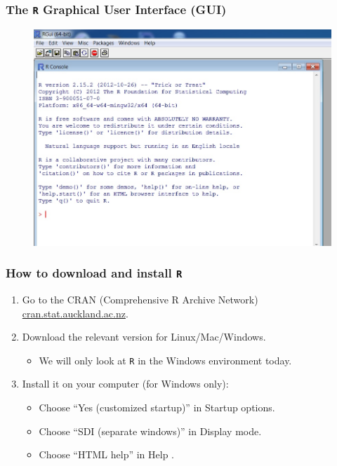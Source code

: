 \documentclass[handout]{beamer}\usepackage[]{graphicx}\usepackage[]{color}
\begin{document}
\begin{frame}
  \frametitle{The \texttt{R} Graphical User Interface (GUI)}
  \begin{figure}[h]
    \centering
    \includegraphics[width = 1\textwidth, keepaspectratio]{Rgui.jpg}
  \end{figure}
\end{frame}


\begin{frame}
  \frametitle{How to download and install \texttt{R}}
  \begin{enumerate}
  \item Go to the CRAN (Comprehensive R Archive Network)
    \url{cran.stat.auckland.ac.nz}.
  \item Download the relevant version for Linux/Mac/Windows.
    \begin{itemize}
    \item We will only look at \texttt{R} in the Windows environment today.
    \end{itemize}
  \item Install it on your computer (for Windows only):
    \begin{itemize}
    \item Choose ``Yes (customized startup)'' in Startup options.
    \item Choose ``SDI (separate windows)'' in Display mode.
    \item Choose ``HTML help'' in Help .
    \end{itemize}
  \end{enumerate}
\end{frame}
\end{document}
